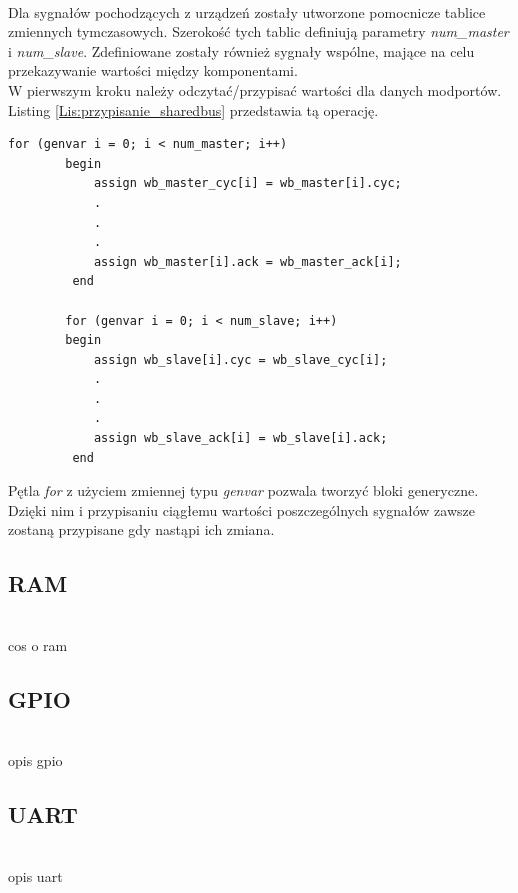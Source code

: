 \documentclass[11pt,a4paper]{article}
\begin{document}
\\
		Dla sygnałów pochodzących z urządzeń zostały utworzone pomocnicze tablice zmiennych tymczasowych. Szerokość tych tablic definiują parametry \textit{num\_master} i \textit{num\_slave}. Zdefiniowane zostały również sygnały wspólne, mające na celu przekazywanie wartości między komponentami.\\
		W pierwszym kroku należy odczytać/przypisać wartości dla danych modportów. Listing \ref{Lis:przypisanie_sharedbus} przedstawia tą operację.\\
				\begin{minipage}{\textwidth}
\begin{scriptsize}
\begin{lstlisting}[label=Lis:przypisanie_sharedbus,caption=Przykładowa inicjalizacja modułu \textit{wishbone\_sharedbus}]
    for (genvar i = 0; i < num_master; i++)
        begin
            assign wb_master_cyc[i] = wb_master[i].cyc;
            .
            .
            .
            assign wb_master[i].ack = wb_master_ack[i];            
         end

        for (genvar i = 0; i < num_slave; i++)
        begin
            assign wb_slave[i].cyc = wb_slave_cyc[i];
            .
            .
            .            
            assign wb_slave_ack[i] = wb_slave[i].ack;            
         end
\end{lstlisting}
\end{scriptsize}
\end{minipage}
Pętla \textit{for} z użyciem zmiennej typu \textit{genvar} pozwala tworzyć bloki generyczne. Dzięki nim i przypisaniu ciągłemu wartości poszczególnych sygnałów zawsze zostaną przypisane gdy nastąpi ich zmiana.
	\subsection{RAM}
	\hspace{5mm}
		\\cos o ram

	\subsection{GPIO}
	\hspace{5mm}
		\\opis gpio

	\subsection{UART}
	\hspace{5mm}
		\\opis uart
\end{document}
